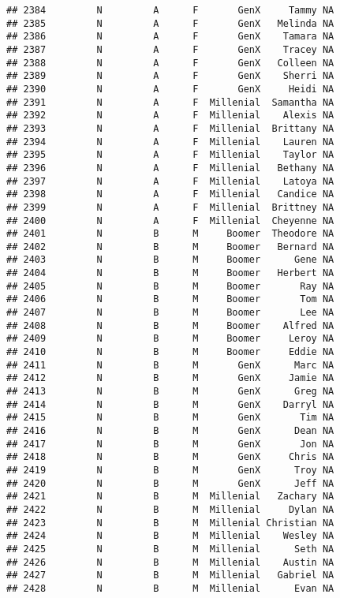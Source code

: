 \documentclass[
]{article}
\begin{document}
\begin{verbatim}
## 2384         N         A      F       GenX     Tammy NA
## 2385         N         A      F       GenX   Melinda NA
## 2386         N         A      F       GenX    Tamara NA
## 2387         N         A      F       GenX    Tracey NA
## 2388         N         A      F       GenX   Colleen NA
## 2389         N         A      F       GenX    Sherri NA
## 2390         N         A      F       GenX     Heidi NA
## 2391         N         A      F  Millenial  Samantha NA
## 2392         N         A      F  Millenial    Alexis NA
## 2393         N         A      F  Millenial  Brittany NA
## 2394         N         A      F  Millenial    Lauren NA
## 2395         N         A      F  Millenial    Taylor NA
## 2396         N         A      F  Millenial   Bethany NA
## 2397         N         A      F  Millenial    Latoya NA
## 2398         N         A      F  Millenial   Candice NA
## 2399         N         A      F  Millenial  Brittney NA
## 2400         N         A      F  Millenial  Cheyenne NA
## 2401         N         B      M     Boomer  Theodore NA
## 2402         N         B      M     Boomer   Bernard NA
## 2403         N         B      M     Boomer      Gene NA
## 2404         N         B      M     Boomer   Herbert NA
## 2405         N         B      M     Boomer       Ray NA
## 2406         N         B      M     Boomer       Tom NA
## 2407         N         B      M     Boomer       Lee NA
## 2408         N         B      M     Boomer    Alfred NA
## 2409         N         B      M     Boomer     Leroy NA
## 2410         N         B      M     Boomer     Eddie NA
## 2411         N         B      M       GenX      Marc NA
## 2412         N         B      M       GenX     Jamie NA
## 2413         N         B      M       GenX      Greg NA
## 2414         N         B      M       GenX    Darryl NA
## 2415         N         B      M       GenX       Tim NA
## 2416         N         B      M       GenX      Dean NA
## 2417         N         B      M       GenX       Jon NA
## 2418         N         B      M       GenX     Chris NA
## 2419         N         B      M       GenX      Troy NA
## 2420         N         B      M       GenX      Jeff NA
## 2421         N         B      M  Millenial   Zachary NA
## 2422         N         B      M  Millenial     Dylan NA
## 2423         N         B      M  Millenial Christian NA
## 2424         N         B      M  Millenial    Wesley NA
## 2425         N         B      M  Millenial      Seth NA
## 2426         N         B      M  Millenial    Austin NA
## 2427         N         B      M  Millenial   Gabriel NA
## 2428         N         B      M  Millenial      Evan NA

\end{verbatim}
\end{document}
